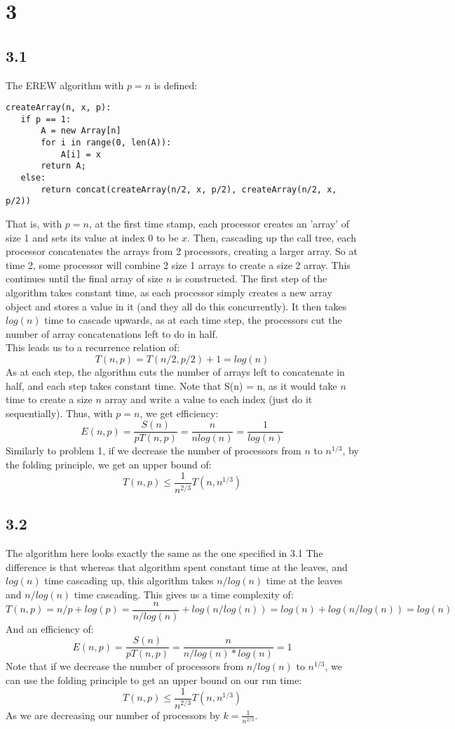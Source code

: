 \documentclass[letterpaper,notitlepage,twoside]{article}
\begin{document}
\section*{3}

\subsection*{3.1}
The EREW algorithm with $p=n$ is defined:
\begin{verbatim}
createArray(n, x, p):
   if p == 1:
       A = new Array[n]
       for i in range(0, len(A)):
           A[i] = x
       return A;
   else:
       return concat(createArray(n/2, x, p/2), createArray(n/2, x, p/2))
\end{verbatim}
That is, with $p=n$, at the first time stamp, each processor creates an 'array' of size 1 and sets its value at index 0 to be $x$. Then, cascading up the call tree, each processor concatenates the arrays from 2 processors, creating a larger array. So at time 2, some processor will combine 2 size 1 arrays to create a size 2 array. This continues until the final array of size $n$ is constructed. The first step of the algorithm takes constant time, as each processor simply creates a new array object and stores a value in it (and they all do this concurrently). It then takes $log(n)$ time to cascade upwards, as at each time step, the processors cut the number of array concatenations left to do in half. \\
This leads us to a recurrence relation of:
$$T(n, p) = T(n/2, p/2) + 1 = log(n)$$
As at each step, the algorithm cuts the number of arrays left to concatenate in half, and each step takes constant time. Note that S(n) = n, as it would take $n$ time to create a size $n$ array and write a value to each index (just do it sequentially). Thus, with $p=n$, we get efficiency:
$$ E(n, p) = \frac{S(n)}{pT(n, p)} = \frac{n}{nlog(n)} = \frac{1}{log(n)}$$ 
Similarly to problem 1, if we decrease the number of processors from $n$ to $n^{1/3}$, by the folding principle, we get an upper bound of: 
$$T(n, p) \leq \frac{1}{n^{2/3}}T(n, n^{1/3})$$
\subsection*{3.2}
The algorithm here looks exactly the same as the one specified in 3.1 The difference is that whereas that algorithm spent constant time at the leaves, and $log(n)$ time cascading up, this algorithm takes $n/log(n)$ time at the leaves and $n/log(n)$ time cascading. This gives us a time complexity of:
$$T(n, p) = n/p + log(p) = \frac{n}{n/log(n)} + log(n/log(n)) = log(n) + log(n/log(n)) = log(n)$$
And an efficiency of:
$$ E(n, p) = \frac{S(n)}{pT(n, p)} = \frac{n}{n/log(n) * log(n)} = 1$$ 
Note that if we decrease the number of processors from $n/log(n)$ to $n^{1/3}$, we can use the folding principle to get an upper bound on our run time:
$$T(n, p) \leq \frac{1}{n^{2/3}}T(n, n^{1/3})$$
As we are decreasing our number of processors by $k=\frac{1}{n^{2/3}}$.
\end{document}
